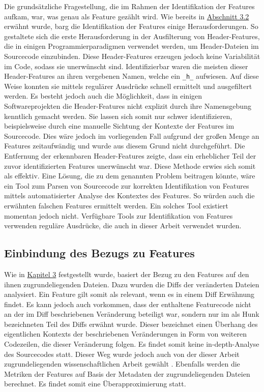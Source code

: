 Die grundsätzliche Fragestellung, die im Rahmen der Identifikation der Features aufkam, war, was genau als Feature gezählt wird. Wie bereits in \hyperref[construction]{Abschnitt 3.2} erwähnt wurde, barg die Identifikation der Features einige Herausforderungen. So gestaltete sich die erste Herausforderung in der Ausfilterung von \glqq Header-Features\grqq{}, die in einigen Programmierparadigmen verwendet werden, um Header-Dateien im Sourcecode einzubinden. Diese Header-Features erzeugen jedoch keine Variabilität im Code, sodass sie unerwünscht sind. Identifizierbar waren die meisten dieser Header-Features an ihren vergebenen Namen, welche ein \texttt{\_h\_} aufwiesen. Auf diese Weise konnten sie mittels regulärer Ausdrücke schnell ermittelt und ausgefiltert werden. Es besteht jedoch auch die Möglichkeit, dass in einigen Softwareprojekten die Header-Features nicht explizit durch ihre Namensgebung kenntlich gemacht werden. Sie lassen sich somit nur schwer identifizieren, beispielsweise durch eine manuelle Sichtung der Kontexte der Features im Sourcecode. Dies wäre jedoch im vorliegenden Fall aufgrund der großen Menge an Features zeitaufwändig und wurde aus diesem Grund nicht durchgeführt. Die Entfernung der erkennbaren Header-Features zeigte, dass ein erheblicher Teil der zuvor identifizierten Features unerwünscht war. Diese Methode erwies sich somit als effektiv.
Eine Lösung, die zu dem genannten Problem beitragen könnte, wäre ein Tool zum Parsen von Sourcecode zur korrekten Identifikation von Features mittels automatisierter Analyse des Kontextes des Features. So würden auch die erwähnten \glqq falschen\grqq{} Features ermittelt werden. Ein solches Tool existiert momentan jedoch nicht. Verfügbare Tools zur Identifikation von Features verwenden reguläre Ausdrücke, die auch in dieser Arbeit verwendet wurden.

\subsection*{Einbindung des Bezugs zu Features}
Wie in \hyperref[dataset-creation]{Kapitel 3} festgestellt wurde, basiert der Bezug zu den Features auf den ihnen zugrundeliegenden Dateien. Dazu wurden die Diffs der veränderten Dateien analysiert. Ein Feature gilt somit als relevant, wenn es in einem Diff Erwähnung findet. Es kann jedoch auch vorkommen, dass der enthaltene Featurecode nicht an der im Diff beschriebenen Veränderung beteiligt war, sondern nur im als \glqq Hunk\grqq{} bezeichneten Teil des Diffs erwähnt wurde. Dieser bezeichnet einen Überhang des eigentlichen Kontexts der beschriebenen Veränderungen in Form von weiteren Codezeilen, die dieser Veränderung folgen. Es findet somit keine \glqq in-depth\grqq -Analyse des Sourcecodes statt. Dieser Weg wurde jedoch auch von der dieser Arbeit zugrundeliegenden wissenschaftlichen Arbeit gewählt \cite{Queiroz2016}. Ebenfalls werden die Metriken der Features auf Basis der Metadaten der zugrundeliegenden Dateien berechnet. Es findet somit eine Überapproximierung statt.

